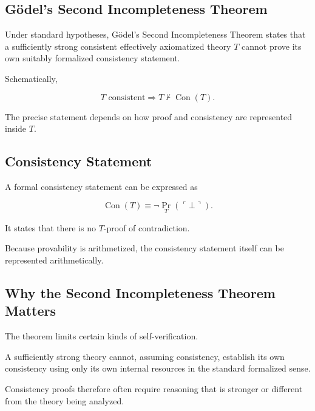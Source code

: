\subsection{Gödel's Second Incompleteness Theorem}
\label{subsec:second-incompleteness}

Under standard hypotheses, Gödel's Second Incompleteness Theorem states
that a sufficiently strong consistent effectively axiomatized theory
\(T\) cannot prove its own suitably formalized consistency statement.

Schematically,

\[
\boxed{
T
\text{ consistent}
\Longrightarrow
T\nvdash
\operatorname{Con}(T).
}
\]

The precise statement depends on how proof and consistency are represented
inside \(T\).

\subsection{Consistency Statement}
\label{subsec:formal-consistency-statement}

A formal consistency statement can be expressed as

\[
\boxed{
\operatorname{Con}(T)
\equiv
\neg
\operatorname{Pr}_T
(
\ulcorner\bot\urcorner
).
}
\]

It states that there is no \(T\)-proof of contradiction.

Because provability is arithmetized, the consistency statement itself can
be represented arithmetically.

\subsection{Why the Second Incompleteness Theorem Matters}
\label{subsec:why-second-incompleteness-matters}

The theorem limits certain kinds of self-verification.

A sufficiently strong theory cannot, assuming consistency, establish its
own consistency using only its own internal resources in the standard
formalized sense.

Consistency proofs therefore often require reasoning that is stronger or
different from the theory being analyzed.

